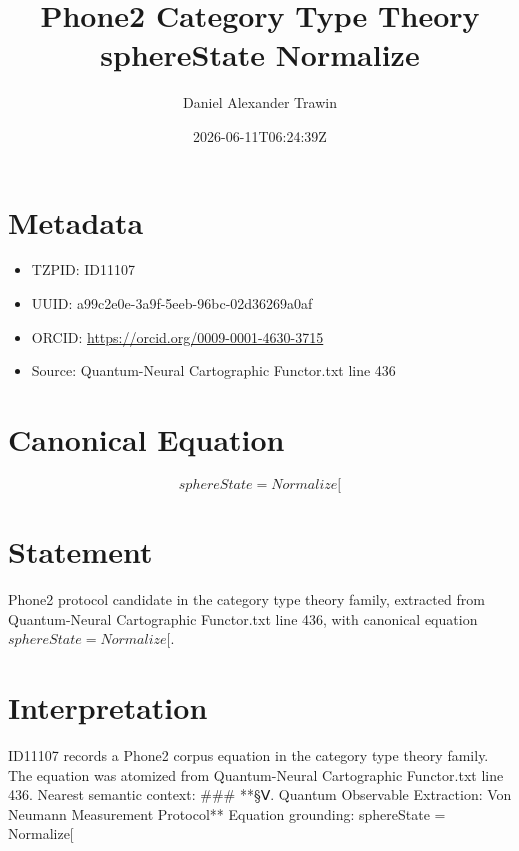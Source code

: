 \documentclass[11pt]{article}
\title{Phone2 Category Type Theory sphereState Normalize}
\author{Daniel Alexander Trawin}
\date{2026-06-11T06:24:39Z}
\begin{document}
\maketitle
\section*{Metadata}
\begin{itemize}
\item TZPID: ID11107
\item UUID: a99c2e0e-3a9f-5eeb-96bc-02d36269a0af
\item ORCID: \url{https://orcid.org/0009-0001-4630-3715}
\item Source: Quantum-Neural Cartographic Functor.txt line 436
\end{itemize}
\section*{Canonical Equation}
\[
sphereState = Normalize[
\]
\section*{Statement}
Phone2 protocol candidate in the category type theory family, extracted from Quantum-Neural Cartographic Functor.txt line 436, with canonical equation $sphereState = Normalize[$.
\section*{Interpretation}
ID11107 records a Phone2 corpus equation in the category type theory family. The equation was atomized from Quantum-Neural Cartographic Functor.txt line 436. Nearest semantic context: ### **§Ⅴ. Quantum Observable Extraction: Von Neumann Measurement Protocol** Equation grounding: sphereState = Normalize[
\end{document}

